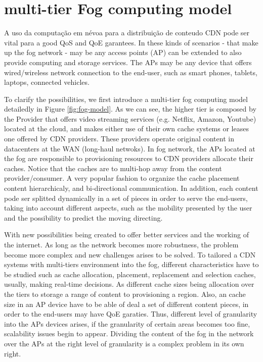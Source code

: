 \section{multi-tier Fog computing model}
\label{sec:fog-model}

 A uso da computação em névoa para a distribuição de conteudo CDN pode ser vital para a good QoS and QoE garantees. In these kinds of scenarios - that make up the fog network - may be any access points (AP) can be extended to also provide computing and storage services. The APs may be any device that offers wired/wireless network connection to the end-user, such as smart phones, tablets, laptops, connected vehicles.%

To clarify the possibilities, we first introduce a multi-tier fog computing model detailedly in Figure \ref{fig:fog-model}. As we can see, the higher tier is composed by the Provider that offers video streaming services (e.g. Netflix, Amazon, Youtube) located at the cloud, and makes either use of their own cache systems or leases one offered by CDN providers. %
These providers operate original content in datacenters at the WAN (long-haul netwoks). In fog network, the APs located at the fog are responsible to provisioning resources to CDN providers allocate their caches. Notice that the caches are to multi-hop away from the content provider/consumer. A very popular fashion to organize the cache placement content hierarchicaly, and bi-directional communication. In addition, each content pode ser splitted dynamically in a set of pieces in order to serve the end-users, taking into account different aspects, such as the mobility presented by the user and the possibility to predict the moving directing. 

With new possibilities being created to offer better services and the working of the internet. As long as the network becomes more robustness, the problem become more complex and new challenges arises to be solved. To tailored a CDN systems with multi-tiers environment into the fog, different characteristics have to be studied such as cache allocation, placement, replacement and selection caches, usually, making real-time decisions. As different cache sizes being allocation over the tiers to storage a range of content to provisioning a region. Also, an cache size in an AP device have to be able of deal a set of different content pieces, in order to the end-users may have QoE garaties. Thus, different level of granularity into the APs devices arises, if the granularity of certain areas becomes too fine, scalability issues begin to appear. Dividing the content of the fog in the network over the APs at the right level of granularity is a complex problem in its own right.
 
